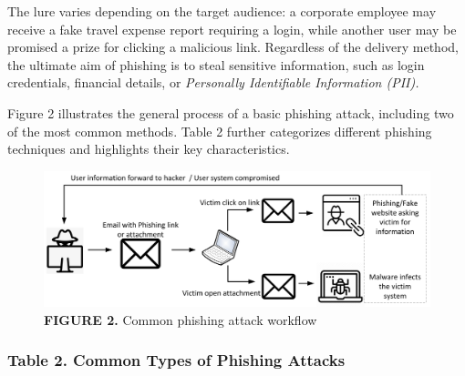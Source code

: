 {The lure varies depending on the target audience: a corporate employee may receive a fake travel expense report requiring a login, while another user may be promised a prize for clicking a malicious link. Regardless of the delivery method, the ultimate aim of phishing is to steal sensitive information, such as login credentials, financial details, or \textit{Personally Identifiable Information (PII).}

Figure 2 illustrates the general process of a basic phishing attack, including two of the most common methods. Table 2 further categorizes different phishing techniques and highlights their key characteristics.

\begin{figure}
    \centering
    \includegraphics[width=1\linewidth]{phish.png}
    \caption{\textbf{FIGURE 2. }Common phishing attack workflow}
    \label{fig:placeholder}
\end{figure}
\subsubsection{Table 2. Common Types of Phishing Attacks}


}
